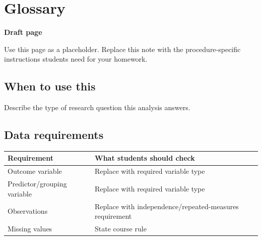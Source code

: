 \documentclass[
  letterpaper,
  DIV=11,
  numbers=noendperiod]{scrreprt}
\newcounter{none} %
\begin{document}
\cleardoublepage
{}
{}
\appendix

\chapter{Glossary}\label{glossary}

\begin{tcolorbox}[enhanced jigsaw, arc=.35mm, bottomrule=.15mm, breakable, colback=white, colframe=quarto-callout-note-color-frame, left=2mm, leftrule=.75mm, opacityback=0, rightrule=.15mm, toprule=.15mm]
\begin{minipage}[t]{5.5mm}
\textcolor{quarto-callout-note-color}{\faInfo}
\end{minipage}%
\begin{minipage}[t]{\textwidth - 5.5mm}

\vspace{-3mm}\textbf{Draft page}\vspace{3mm}

Use this page as a placeholder. Replace this note with the
procedure-specific instructions students need for your homework.

\end{minipage}%
\end{tcolorbox}

\section{When to use this}\label{when-to-use-this-13}

Describe the type of research question this analysis answers.

\section{Data requirements}\label{data-requirements-14}

{\def\LTcaptype{none} %
\begin{longtable}[]{@{}
  >{\raggedright\arraybackslash}p{}
  >{\raggedright\arraybackslash}p{}@{}}
\toprule\noalign{}
\begin{minipage}[b]{\linewidth}\raggedright
Requirement
\end{minipage} & \begin{minipage}[b]{\linewidth}\raggedright
What students should check
\end{minipage} \\
\midrule\noalign{}
\endhead
\bottomrule\noalign{}
\endlastfoot
Outcome variable & Replace with required variable type \\
Predictor/grouping variable & Replace with required variable type \\
Observations & Replace with independence/repeated-measures
requirement \\
Missing values & State course rule \\
\end{longtable}
}
\end{document}
